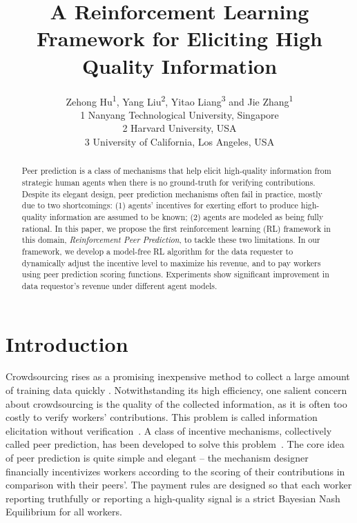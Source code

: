 \documentclass[letterpaper]{article} %
\begin{document}
%
\title{A Reinforcement Learning Framework for Eliciting High Quality Information}
\author{Zehong Hu\textsuperscript{1}, Yang Liu\textsuperscript{2}, Yitao Liang\textsuperscript{3} and Jie Zhang\textsuperscript{1}\\
1 Nanyang Technological University, Singapore\\
2 Harvard University, USA\\
3 University of California, Los Angeles, USA\\}
\maketitle
\begin{abstract}
Peer prediction is a class of mechanisms that help elicit high-quality information from strategic human agents when there is no ground-truth for verifying contributions. Despite its elegant design, peer prediction mechanisms often fail in practice, mostly due to two shortcomings: (1) agents' incentives for exerting effort to produce high-quality information are assumed to be known; (2) agents are modeled as being fully rational. In this paper, we propose the first reinforcement learning (RL) framework in this domain, \emph{Reinforcement Peer Prediction}, to tackle these two limitations. In our framework, we develop a model-free RL algorithm for the data requester to dynamically adjust the incentive level to maximize his revenue, and to pay workers using peer prediction scoring functions. Experiments show significant improvement in data requestor's revenue under different agent models.
\end{abstract}

\section{Introduction}
Crowdsourcing rises as a promising inexpensive method to collect a large amount of training data quickly \cite{snow2008cheap,deng2009imagenet}.
Notwithstanding its high efficiency, one salient concern about crowdsourcing is the quality of the collected information, as it is often too costly to verify workers' contributions.
This problem is called information elicitation without verification~\cite{waggoner2014output}.
A class of incentive mechanisms, collectively called peer prediction, has been developed to solve this problem~\cite{miller2005eliciting,jurca2009mechanisms,witkowski2012robust,witkowski2012peer,radanovic2013robust}.
The core idea of peer prediction is quite simple and elegant -- the mechanism designer financially incentivizes 
workers according to the scoring of their contributions in comparison with their peers'. The payment rules are designed so that each worker reporting truthfully or reporting a high-quality signal is a strict Bayesian Nash Equilibrium for all workers.
\end{document}
